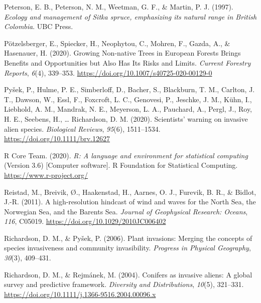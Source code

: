 \documentclass[
]{article}
\newlength{\cslhangindent}
\newenvironment{CSLReferences}[2] %
 {\begin{list}{}{%
  \setlength{\itemindent}{0pt}
  \setlength{\leftmargin}{0pt}
  \setlength{\parsep}{0pt}
  \ifodd #1
   \setlength{\leftmargin}{\cslhangindent}
   \setlength{\itemindent}{-1\cslhangindent}
  \fi
  \setlength{\itemsep}{#2\baselineskip}}}
 {\end{list}}
\begin{document}
\begin{CSLReferences}{1}{0}
Peterson, E. B., Peterson, N. M., Weetman, G. F., \& Martin, P. J. (1997). \emph{Ecology and management of {Sitka} spruce, emphasizing its natural range in {British Colombia}}. {UBC Press}.

Pötzelsberger, E., Spiecker, H., Neophytou, C., Mohren, F., Gazda, A., \& Hasenauer, H. (2020). Growing {Non-native Trees} in {European Forests Brings Benefits} and {Opportunities} but {Also Has Its Risks} and {Limits}. \emph{Current Forestry Reports}, \emph{6}(4), 339--353. \url{https://doi.org/10.1007/s40725-020-00129-0}

Pyšek, P., Hulme, P. E., Simberloff, D., Bacher, S., Blackburn, T. M., Carlton, J. T., Dawson, W., Essl, F., Foxcroft, L. C., Genovesi, P., Jeschke, J. M., Kühn, I., Liebhold, A. M., Mandrak, N. E., Meyerson, L. A., Pauchard, A., Pergl, J., Roy, H. E., Seebens, H., \ldots{} Richardson, D. M. (2020). Scientists' warning on invasive alien species. \emph{Biological Reviews}, \emph{95}(6), 1511--1534. \url{https://doi.org/10.1111/brv.12627}

R Core Team. (2020). \emph{R: A language and environment for statistical computing} (Version 3.6) {[}Computer software{]}. {R Foundation for Statistical Computing}. \url{https://www.r-project.org/}

Reistad, M., Breivik, Ø., Haakenstad, H., Aarnes, O. J., Furevik, B. R., \& Bidlot, J.-R. (2011). A high-resolution hindcast of wind and waves for the {North Sea}, the {Norwegian Sea}, and the {Barents Sea}. \emph{Journal of Geophysical Research: Oceans}, \emph{116}, C05019. \url{https://doi.org/10.1029/2010JC006402}

Richardson, D. M., \& Pyšek, P. (2006). Plant invasions: Merging the concepts of species invasiveness and community invasibility. \emph{Progress in Physical Geography}, \emph{30}(3), 409--431.

Richardson, D. M., \& Rejmánek, M. (2004). Conifers as invasive aliens: A global survey and predictive framework. \emph{Diversity and Distributions}, \emph{10}(5), 321--331. \url{https://doi.org/10.1111/j.1366-9516.2004.00096.x}


\end{CSLReferences}
\end{document}
